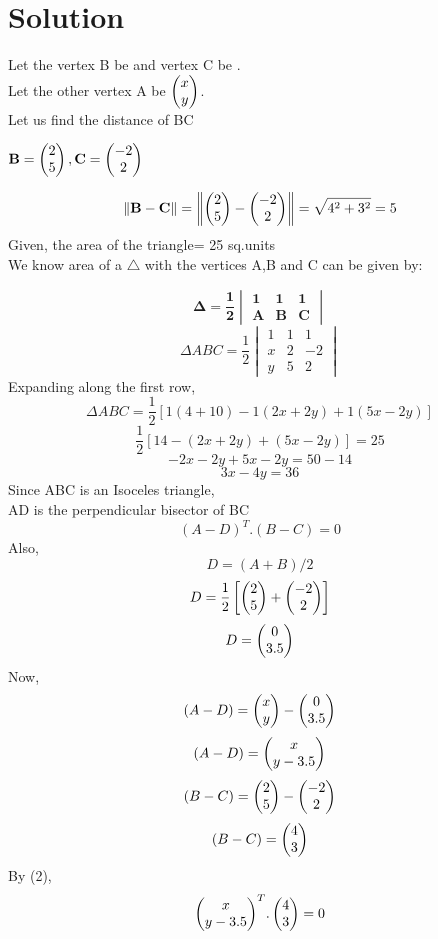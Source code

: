 \documentclass[journal,12pt,twocolumn]{IEEEtran}
\begin{document}
\noindent
\section*{\textbf{Solution}}
\noindent
Let the vertex B be  and vertex C be .\\[6pt]
Let the other vertex A be $\begin{pmatrix}x\\y\end{pmatrix}$.\\[6pt]
Let us find the distance of BC
\begin{center}
$\mathbf{B} = \begin{pmatrix}2\\5\end{pmatrix}, \mathbf{C} =\begin{pmatrix}-2\\2\end{pmatrix}$
\end{center}
$$\left\|\mathbf{B-C}\right\|=\left\|\mathbf{\begin{pmatrix}2\\5\end{pmatrix}-\begin{pmatrix}-2\\2\end{pmatrix}}\right\|=\sqrt{4^2+3^2}=5$$
Given, the area of the triangle= 25 sq.units\\
We know area of a $\triangle$ with the vertices A,B and C
can be given by:

$$ \label{eq:area_tri}
\mathbf{\Delta = \frac{1}{2}\begin{vmatrix}
1 & 1 & 1\\ 
A & B & C
\end{vmatrix}}$$
$$\Delta ABC=\frac{1}{2}\begin{vmatrix}
1 & 1 & 1\\ 
x & 2 & -2\\ 
y & 5 & 2
\end{vmatrix}$$
Expanding along the first row,\\
$$\Delta ABC=\frac{1}{2}\left [ 1(4+10)-1(2x+2y)+1(5x-2y) \right ]$$
$$\frac{1}{2}\left [14-(2x+2y)+(5x-2y) \right ]=25$$
$$-2x-2y+5x-2y=50-14$$
\begin{equation}
 3x-4y=36    
\end{equation}
\noindent
Since ABC is an Isoceles triangle, \\ AD is the perpendicular bisector of BC
\begin{equation}
    ( A-D )^T . ( B-C ) = 0
\end{equation}
Also, $$D=(A+B)/2$$
$$D=\frac{1}{2}\left[ \begin{pmatrix}2\\5\end{pmatrix} + \begin{pmatrix}-2\\2\end{pmatrix}\right]$$
$$D=\begin{pmatrix}0\\3.5\end{pmatrix}$$
Now,
$$(A-D)= \begin{pmatrix}x\\y\end{pmatrix}- \begin{pmatrix}0\\3.5\end{pmatrix}$$
$$(A-D)= \begin{pmatrix}x\\y-3.5\end{pmatrix}$$
$$(B-C)= \begin{pmatrix}2\\5\end{pmatrix}- \begin{pmatrix}-2\\2\end{pmatrix} $$
$$(B-C)= \begin{pmatrix}4\\3\end{pmatrix} $$
By (2),
$${\begin{pmatrix}x\\y-3.5\end{pmatrix}}^T.\begin{pmatrix}4\\3\end{pmatrix}=0$$
\end{document}
